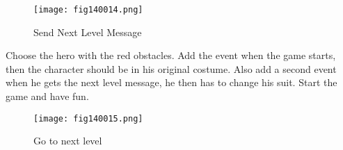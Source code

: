 \begin{figure}[H]
   \centering
   \texttt{[image: fig140014.png]}
   \caption{Send Next Level Message}
\label{fig140014}
\end{figure}

Choose the hero with the red obstacles. Add the event when the game starts, then the character should be in his original costume. Also add a second event when he gets the next level message, he then has to change his suit. Start the game and have fun.

\begin{figure}[H]
   \centering
   \texttt{[image: fig140015.png]}
   \caption{Go to next level}
\label{fig140015}
\end{figure}
